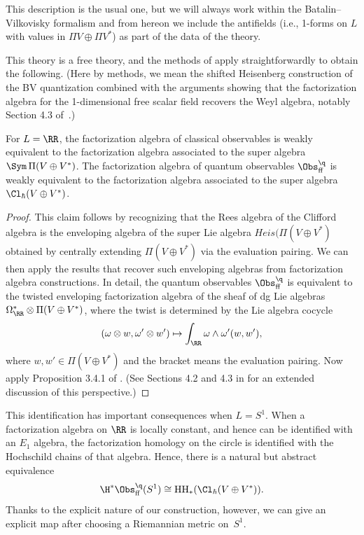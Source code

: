\documentclass[10pt]{amsart}
\begin{document}
This description is the usual one, but we will always work within the Batalin--Vilkovisky formalism and from hereon we include the antifields (i.e., 1-forms on $L$ with values in $\Pi V \oplus \Pi V^*$) as part of the data of the theory.

This theory is a free theory, and the methods of \cite{CG1} apply straightforwardly to obtain the following.
(Here by methods, we mean the shifted Heisenberg construction of the BV quantization combined with the arguments showing that the factorization algebra for the 1-dimensional free scalar field recovers the Weyl algebra, notably Section 4.3 of~\cite{CG1}.)

\begin{lmm}
\label{lmm: free fermion observables}
For $L = \RR$, the factorization algebra of classical observables is weakly equivalent to the factorization algebra associated to the super algebra $\Sym\, \Pi (V \oplus V^*)$.
The factorization algebra of quantum observables $\Obs^\q_{\rm ff}$ is weakly equivalent to the factorization algebra associated to the super algebra $\Cl_\hbar(V \oplus V^*)$.
\end{lmm}

\begin{proof}
This claim follows by recognizing that the Rees algebra of the Clifford algebra is the enveloping algebra of the super Lie algebra $Heis(\Pi (V \oplus V^*)$ obtained by centrally extending $\Pi (V \oplus V^*)$ via the evaluation pairing.
We can then apply the results that recover such enveloping algebras from factorization algebra constructions.
In detail, the quantum observables $\Obs^\q_{\rm ff}$ is equivalent to the twisted enveloping factorization algebra of the sheaf of dg Lie algebras $\Omega^*_\RR \otimes \Pi (V \oplus V^*)$, 
where the twist is determined by the Lie algebra cocycle 
\[
(\omega \otimes w, \omega' \otimes w') \mapsto \int_\RR \omega \wedge \omega' (w,w'),
\]
where $w,w' \in \Pi (V \oplus V^*)$ and the bracket means the evaluation pairing.
Now apply Proposition 3.4.1 of \cite{CG1}.
(See Sections 4.2 and 4.3 in \cite{CG1} for an extended discussion of this perspective.)
\end{proof}

This identification has important consequences when $L = S^1$.
When a factorization algebra on $\RR$ is locally constant, and hence can be identified with an $E_1$ algebra, 
the factorization homology on the circle is identified with the Hochschild chains of that algebra.
Hence, there is a natural but abstract equivalence
\[
\H^* \Obs^\q_{\rm ff}(S^1) \cong {\rm {\rm HH}}_*(\Cl_\hbar(V \oplus V^*)).
\]
Thanks to the explicit nature of our construction, however, we can give an explicit map
after choosing a Riemannian metric on~$S^1$. 
\end{document}
